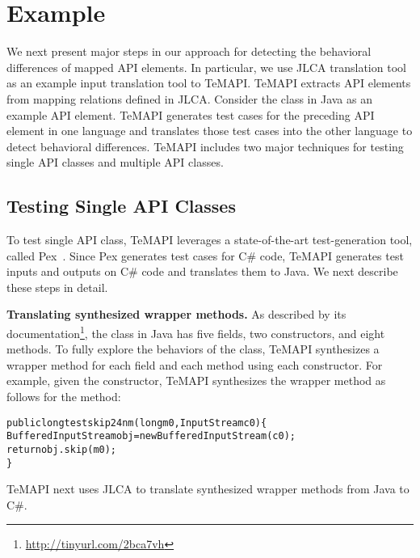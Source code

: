 \section{Example}
\label{sec:example}

We next present major steps in our approach for detecting the behavioral differences of mapped API elements. In particular, we use JLCA translation tool as an example input translation tool to TeMAPI. TeMAPI extracts API elements from mapping relations defined in JLCA. Consider the  class in Java as an example API element. TeMAPI generates test cases for the preceding API element in one language and translates those test cases into the other language to detect behavioral differences. TeMAPI includes two major techniques for testing single API classes and multiple API classes.  

\subsection{Testing Single API Classes} 

To test single API class, TeMAPI leverages a state-of-the-art test-generation tool, called Pex~\cite{tillmann2008pex}. Since Pex generates test cases for C\# code, TeMAPI generates test inputs and outputs on C\# code and translates them to Java. We next describe these steps in detail.

\textbf{Translating synthesized wrapper methods.} As described by its documentation\footnote{\url{http://tinyurl.com/2bca7vh}}, the  class in Java has five fields, two constructors, and eight methods. To fully explore the behaviors of the class, TeMAPI synthesizes a wrapper method for each field and each method using each constructor. For example, given the  constructor, TeMAPI synthesizes the wrapper method as follows for the  method:

\begin{CodeOut}\vspace*{-1ex}
\begin{alltt}
public long testskip24nm(long m0,InputStream c0)\{
  BufferedInputStream obj = new BufferedInputStream(c0);
  return obj.skip(m0);
\}
\end{alltt}
\end{CodeOut}\vspace*{-2ex}

TeMAPI next uses JLCA to translate synthesized wrapper methods from Java to C\#.

